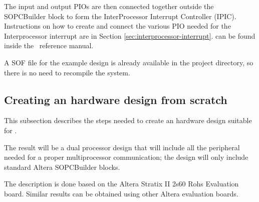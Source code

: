 The input and output PIOs are then connected together outside the
SOPCBuilder block to form the InterProcessor Interrupt Controller
(IPIC). Instructions on how to create and connect the various PIO
needed for the Interprocessor interrupt 
are in Section \ref{sec:interprocessor-interrupt}.
can be found inside the \ee\ reference manual.

A SOF file for the example design is already available in the project
directory, so there is no need to recompile the system.

\subsection{Creating an hardware design from scratch}

This subsection describes the steps needed to create an hardware
design suitable for \ee. 

The result will be a dual processor design
that will include all the peripheral needed for a proper
multiprocessor communication; the design will only include standard
Altera SOPCBuilder blocks.

The description is done based on the Altera Stratix II 2s60 Rohs
Evaluation board. Similar results can be obtained using other Altera
evaluation boards.

